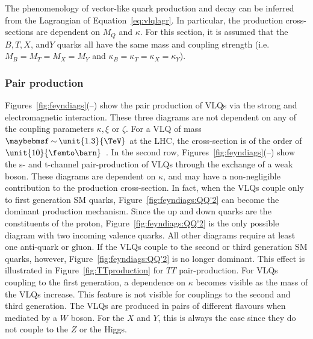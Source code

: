 The phenomenology of vector-like quark production and decay can be inferred from the Lagrangian of Equation~\ref{eq:vlqlagr}. In particular, the production cross-sections are dependent on $M_Q$ and $\kappa$. For this section, it is assumed that the $B,T,X$, and$Y$ quarks all have the same mass and coupling strength (i.e. $M_B = M_T = M_X = M_Y$ and $\kappa_B = \kappa_T = \kappa_X = \kappa_Y$). 

\subsubsection{Pair production}

Figures~\ref{fig:feyndiags}(--) show the pair production of VLQs via the strong and electromagnetic interaction. These three diagrams are not dependent on any of the coupling parameters $\kappa,\xi$ or $\zeta$. For a VLQ of mass
$\sim \unit{1.3}{\TeV}$ at the LHC, the cross-section is of the order of $\unit{10}{\femto\barn}$~\cite{VLQ_contur}. In the second row, Figures~\ref{fig:feyndiags}(--) show the s- and t-channel pair-production of VLQs through the exchange of a weak boson. These diagrams are dependent on $\kappa$, and may have a non-negligible contribution to the production cross-section. In fact, when the VLQs couple only to first generation SM quarks, Figure~\ref{fig:feyndiags:QQ'2} can become the dominant production mechanism. Since the up and down quarks are the constituents of the proton, Figure~\ref{fig:feyndiags:QQ'2} is the only possible diagram with two incoming valence quarks. All other diagrams require at least one anti-quark or gluon. If the VLQs couple to the second or third generation SM quarks, however, Figure~\ref{fig:feyndiags:QQ'2} is no longer dominant. This effect is illustrated in Figure~\ref{fig:TTproduction} for $TT$ pair-production. For VLQs coupling to the first generation, a dependence on $\kappa$ becomes visible as the mass of the VLQs increase. This feature is not visible for couplings to the second and third generation. The VLQs are produced in pairs of different flavours when mediated by a $W$ boson. For the $X$ and $Y$, this is always the case since they do not couple to the $Z$ or the Higgs. 

